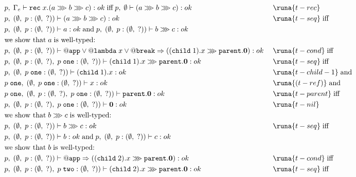 \begin{align*}
&    p,\; \Gamma_e \vdash \texttt{rec}\; x.(a \ggg b \ggg c) : ok\; \text{iff}\; p,\; \emptyset \vdash (a \ggg b \ggg c) : ok\; &&\runa{t-rec}\\
%
%
%
&p,\; (\emptyset,\; p : (\emptyset,\; ?)) \vdash (a \ggg b \ggg c) : ok\; &&\runa{t-seq}\; \text{iff}\;\\ 
&p,\; (\emptyset,\; p : (\emptyset,\; ?)) \vdash a : ok\; \text{and}\; p,\; (\emptyset,\; p : (\emptyset,\; ?)) \vdash b \ggg c : ok \;\\
%
&\text{we show that}\; a\; \text{is well-typed:}\\
%
&p,\; (\emptyset,\; p : (\emptyset,\; ?)) \vdash @\texttt{app} \lor @\texttt{lambda}\; x \lor @\texttt{break} \Rightarrow ((\texttt{child}\; 1).x \ggg \texttt{parent}.\mathbf{0}) : ok\; &&\runa{t-cond}\;\text{iff}\\
%
%
&p,\; (\emptyset,\; p : (\emptyset,\; ?),\; p\; \texttt{one} : (\emptyset,\; ?)) \vdash (\texttt{child}\; 1).x \ggg \texttt{parent}.\mathbf{0} : ok\; &&\runa{t-seq}\; \text{iff} \\
%
%
&p,\; (\emptyset,\; p\; \texttt{one} : (\emptyset,\; ?)) \vdash (\texttt{child}\; 1).x : ok\; &&\runa{t-child-1} \; \text{and}\\
%
&p\; \texttt{one},\; (\emptyset,\; p\; \texttt{one} : (\emptyset,\; ?)) \vdash x : ok\; &&\runa{(t-ref)}\; \text{and} \\
%
&p\; \texttt{one},\; (\emptyset,\; p : (\emptyset,\; ?),\; p\; \texttt{one} : (\emptyset,\; ?)) \vdash \texttt{parent}.\mathbf{0} : ok\; &&\runa{t-parent}\; \text{iff}\\
%
%
&p,\; (\emptyset,\; p : (\emptyset,\; ?),\; p\; \texttt{one} : (\emptyset,\; ?)) \vdash \mathbf{0} : ok\; &&\runa{t-nil}\\
%
%
&\text{we show that}\; b \ggg c\; \text{is well-typed:}\\
%
%
&p,\; (\emptyset,\; p : (\emptyset,\; ?)) \vdash b \ggg c : ok\; &&\runa{t-seq}\; \text{iff}\\
%
%
&p,\; (\emptyset,\; p : (\emptyset,\; ?)) \vdash b : ok\; \text{and}\; p,\; (\emptyset,\; p : (\emptyset,\; ?)) \vdash c : ok\\
%
%
&\text{we show that}\; b\; \text{is well-typed:}\\
%
&p,\; (\emptyset,\; p : (\emptyset,\; ?)) \vdash @\texttt{app} \Rightarrow ((\texttt{child}\; 2).x \ggg \texttt{parent}.\mathbf{0}) : ok\; &&\runa{t-cond}\; \text{iff}\\
%
&p,\; (\emptyset,\; p : (\emptyset,\; ?),\; p\; \texttt{two} : (\emptyset,\; ?)) \vdash (\texttt{child}\; 2).x \ggg \texttt{parent}.\mathbf{0} : ok\; &&\runa{t-seq}\; \text{iff}\\

\end{align*}
